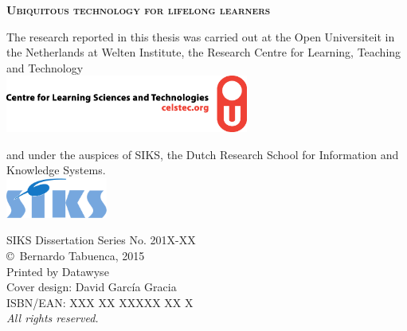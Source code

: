 \documentclass[normalheadings,tablecaptionabove,twoside,openright,chapterprefix,halfparskip,fontsize=10pt,numbers=noenddot]{scrbook} %
\begin{document}
\nocite{*} %

\begin{titlepage}
	\null\vspace*{15.25em}
	\center
	\huge
	\textbf{\textsc{Ubiquitous technology for lifelong learners}}\\
	\vfill\null
	
	\newpage
	\pagestyle{empty}
	\raggedright
	\normalsize
	The research reported in this thesis was carried out at the Open Universiteit in the Netherlands at Welten Institute, the Research Centre for Learning, Teaching and Technology\\
	\vspace*{1em}
	\center
	\includegraphics[width=0.6\textwidth]{figures/Celstec-logo} \\ %
	\vspace*{1em}
	\raggedright
	and under the auspices of SIKS, the Dutch Research School for Information and Knowledge Systems.\\
	\vspace*{1em}
	\center
	\includegraphics[width=0.25\textwidth]{figures/siks-kleur}\\ %
	\vfill
	\raggedright
	SIKS Dissertation Series No. 201X-XX \\
	\vspace*{2em}
	\copyright~Bernardo Tabuenca, 2015\\
	Printed by Datawyse\\
	Cover design: David Garc\'ia Gracia\\
	\vspace*{2em}
	ISBN/EAN: XXX XX XXXXX XX X\\
	\textit{All rights reserved.}
	

\end{titlepage}
\end{document}
